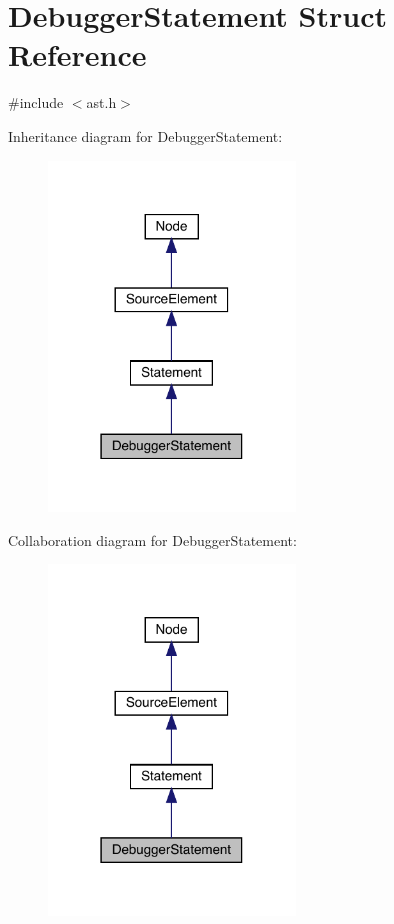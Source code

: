 \hypertarget{struct_debugger_statement}{}\section{Debugger\+Statement Struct Reference}
\label{struct_debugger_statement}


{\ttfamily \#include $<$ast.\+h$>$}



Inheritance diagram for Debugger\+Statement\+:\nopagebreak
\begin{figure}[H]
\begin{center}
\leavevmode
\includegraphics[width=186pt]{struct_debugger_statement__inherit__graph}
\end{center}
\end{figure}


Collaboration diagram for Debugger\+Statement\+:\nopagebreak
\begin{figure}[H]
\begin{center}
\leavevmode
\includegraphics[width=186pt]{struct_debugger_statement__coll__graph}
\end{center}
\end{figure}
